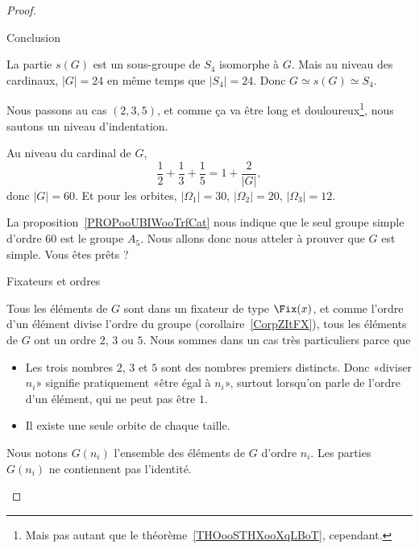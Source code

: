 \begin{proof}
\begin{subproof}
\begin{subproof}
                    \item[Conclusion]

                        La partie \( s(G)\) est un sous-groupe de \( S_4\) isomorphe à \( G\). Mais au niveau des cardinaux, \( | G |=24\) en même temps que \( | S_4 |=24\). Donc \( G\simeq s(G)\simeq S_4\).

                \end{subproof}
                \end{subproof}

        Nous passons au cas \( (2,3,5)\), et comme ça va être long et douloureux\footnote{Mais pas autant que le théorème~\ref{THOooSTHXooXqLBoT}, cependant.}, nous sautons un niveau d'indentation.

                Au niveau du cardinal de \( G\),
                \begin{equation}
                    \frac{1}{ 2 }+\frac{1}{ 3 }+\frac{1}{ 5 }=1+\frac{ 2 }{ | G | },
                \end{equation}
                donc \( | G |=60\). Et pour les orbites, \( | \Omega_1 |=30\), \( | \Omega_2 |=20\), \( | \Omega_3 |=12\).

                La proposition~\ref{PROPooUBIWooTrfCat} nous indique que le seul groupe simple d'ordre \( 60\) est le groupe \( A_5\). Nous allons donc nous atteler à prouver que \( G\) est simple. Vous êtes prêts ?


                \begin{subproof}
                    \item[Fixateurs et ordres]

                Tous les éléments de \( G\) sont dans un fixateur de type \( \Fix(x)\), et comme l'ordre d'un élément divise l'ordre du groupe (corollaire~\ref{CorpZItFX}), tous les éléments de \( G\) ont un ordre \( 2\), \( 3\) ou \( 5\). Nous sommes dans un cas très particuliers parce que
                \begin{itemize}
                    \item Les trois nombres \( 2\), \( 3\) et \( 5\) sont des nombres premiers distincts. Donc «diviser \( n_i\)» signifie pratiquement «être égal à \( n_i\)», surtout lorsqu'on parle de l'ordre d'un élément, qui ne peut pas être \( 1\).
                    \item Il existe une seule orbite de chaque taille.
                \end{itemize}
            Nous notons \( G(n_i)\) l'ensemble des éléments de \( G\) d'ordre \( n_i\). Les parties \( G(n_i)\) ne contiennent pas l'identité.


\end{subproof}
\end{proof}
